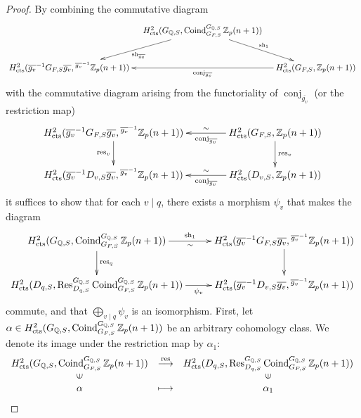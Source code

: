 \documentclass{article}
\numberwithin{equation}{section} %
\begin{document}
\begin{proof}
By combining the commutative diagram
\[
  \xymatrix@C=10pt{
    & H^2_{\rm cts}(G_{\mathbb{Q},S}, \operatorname{Coind}_{G_{F,S}}^{G_{\mathbb{Q},S}}\mathbb{Z}_p(n+1)) \ar[ld]^-{\mathrm{sh}_{\overline{g_v}}} \ar[rd]^-{\mathrm{sh}_1} & \\
    H^2_{\rm cts}(\overline{g_v}^{-1}G_{F,S}\overline{g_v},{}^{\overline{g_v}^{-1}}\mathbb{Z}_p(n+1)) & & H^2_{\rm cts}(G_{F,S},\mathbb{Z}_p(n+1)) \ar[ll]^-{\mathrm{conj}_{\overline{g_v}}}
  }
\]
with the commutative diagram arising from the functoriality of $\operatorname{conj}_{\overline{g_v}}$ (or the restriction map)
\[
  \xymatrix@C=40pt{
H^2_{\rm cts}(\overline{g_v}^{-1}G_{F,S}\overline{g_v},{}^{\overline{g_v}^{-1}}\mathbb{Z}_p(n+1)) \ar[d]_-{\mathrm{res}_v} & H^2_{\rm cts}(G_{F,S},\mathbb{Z}_p(n+1)) \ar[l]^-{\mathrm{conj}_{\overline{g_v}}}_-{\sim} \ar[d]^-{\mathrm{res}_v} \\
H^2_{\rm cts}(\overline{g_v}^{-1}D_{v,S}\overline{g_v},{}^{\overline{g_v}^{-1}}\mathbb{Z}_p(n+1)) & H^2_{\rm cts}(D_{v,S},\mathbb{Z}_p(n+1)) \ar[l]^-{\mathrm{conj}_{\overline{g_v}}}_-{\sim}
  }
\]
it suffices to show that for each $v \mid q$, there exists a morphism $\psi_v$ that makes the diagram
\[
  \vcenter{
  \xymatrix@C=10pt{
   H^2_{\rm cts}(G_{{\mathbb{Q},S}}, \operatorname{Coind}_{G_{F,S}}^{G_{\mathbb{Q},S}}\mathbb{Z}_p(n+1)) \ar[d]^-{\mathrm{res}_q} \ar[rr]^-{\mathrm{sh}_1}_-{\sim} & & H^2_{\rm cts}(\overline{g_v}^{-1}G_{F,S}\overline{g_v},{}^{\overline{g_v}^{-1}}\mathbb{Z}_p(n+1)) \ar[d] \\
    H^2_{\rm cts}(D_{q,S}, \operatorname{Res}_{D_{q,S}}^{G_{\mathbb{Q},S}}\operatorname{Coind}_{G_{F,S}}^{G_{\mathbb{Q},S}}\mathbb{Z}_p(n+1)) \ar[rr]_-{\psi_v} & &  H^2_{\rm cts}(\overline{g_v}^{-1}D_{v,S}\overline{g_v},{}^{\overline{g_v}^{-1}}\mathbb{Z}_p(n+1))
  }
  }
\]
commute, and that $\bigoplus_{v \mid q} \psi_v$ is an isomorphism. First, let $\alpha \in H_{\rm cts}^2(G_{\mathbb{Q},S},\operatorname{Coind}_{G_{F,S}}^{G_{\mathbb{Q},S}}\mathbb{Z}_p(n+1))$ be an arbitrary cohomology class. We denote its image under the restriction map by $\alpha_1$:
\[
  \begin{array}{ccc}
H_{\rm cts}^2(G_{\mathbb{Q},S},\operatorname{Coind}_{G_{F,S}}^{G_{\mathbb{Q},S}}\mathbb{Z}_p(n+1))& \stackrel{\mathrm{res}}{\longrightarrow} &  H_{\rm cts}^2(D_{q,S},\operatorname{Res}_{D_{q,S}}^{G_{\mathbb{Q},S}}\operatorname{Coind}_{G_{F,S}}^{G_{\mathbb{Q},S}}\mathbb{Z}_p(n+1))\\
 \rotatebox{90}{$\in$} & & \rotatebox{90}{$\in$}\\
\alpha &\longmapsto  & \alpha_1

\end{array}\]
\end{proof}
\end{document}

